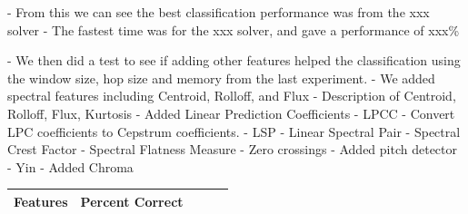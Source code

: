 \documentclass[12pt,oneside]{book}
\begin{document}
- From this we can see the best classification performance was from the xxx solver 
- The fastest time was for the xxx solver, and gave a performance of xxx\%

%
%

- We then did a test to see if adding other features helped the
classification using the window size, hop size and memory from the
last experiment.
- We added spectral features including Centroid, Rolloff, and Flux
- Description of Centroid, Rolloff, Flux, Kurtosis
- Added Linear Prediction Coefficients
- LPCC - Convert LPC coefficients to Cepstrum coefficients.
- LSP - Linear Spectral Pair
- Spectral Crest Factor
- Spectral Flatness Measure 
- Zero crossings
- Added pitch detector - Yin
- Added Chroma

\begin{table}
\begin{tabular}{|l|l|l|l|l|}
\hline
Features & Percent Correct \\
\hline



\end{tabular}
\end{table}
\end{document}
